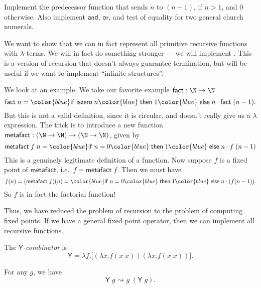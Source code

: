 \documentclass[a4paper]{article}
\newcommand\cif{{\color{blue} \mathsf{if}\;}}
\newcommand\cthen{{\color{blue}\;\mathsf{then}\;}}
\newcommand\celse{{\color{blue}\;\mathsf{else}\;}}
\newcommand\ciszero{\mathsf{iszero}}
\newcommand\cfact{\mathsf{fact}}
\newcommand\metafact{\mathsf{metafact}}
\newcommand\Yc{\mathsf{Y}}
\begin{document}
\begin{ex}
  Implement the predecessor function that sends $n$ to $(n - 1)$, if $n > 1$, and $0$ otherwise. Also implement $\mathsf{and}$, $\mathsf{or}$, and test of equality for two general church numerals. %
\end{ex}
We want to show that we can in fact represent all primitive recursive functions with $\lambda$-terms. We will in fact do something stronger --- we will implement . This is a version of recursion that doesn't always guarantee termination, but will be useful if we want to implement ``infinite structures''.

We look at an example. We take our favorite example $\cfact: \N \to \N$
\[
  \cfact\; n = \cif \ciszero \;n \cthen 1 \celse n \cdot \cfact\; (n - 1).
\]
But this is not a valid definition, since it is circular, and doesn't really give us a $\lambda$ expression. The trick is to introduce a new function $\metafact: (\N \to \N) \to (\N \to \N)$, given by
\[
  \metafact\; f\; n = \cif n = 0 \cthen 1 \celse n \cdot f\; (n - 1)
\]
This is a genuinely legitimate definition of a function. Now suppose $f$ is a fixed point of $\metafact$, i.e.\ $f = \metafact\; f$. Then we must have
\[
  f(n) = (\metafact\; f)(n) = \cif n = 0\cthen 1 \celse n \cdot (f(n - 1)).
\]
So $f$ is in fact the factorial function!

Thus, we have reduced the problem of recursion to the problem of computing fixed points. If we have a general fixed point operator, then we can implement all recursive functions.

\begin{defi}[$\Yc$-combinator]\index{$\Yc$-combinator}
  The \emph{$\Yc$-combinator} is
  \[
    \Yc = \lambda f. \Big[ (\lambda x. f(x\; x)) (\lambda x. f(x\; x))\Big].
  \]
\end{defi}

\begin{thm}
  For any $g$, we have
  \[
    \Yc\; g \rightsquigarrow g\; (\Yc\; g).
  \]
\end{thm}
\end{document}
